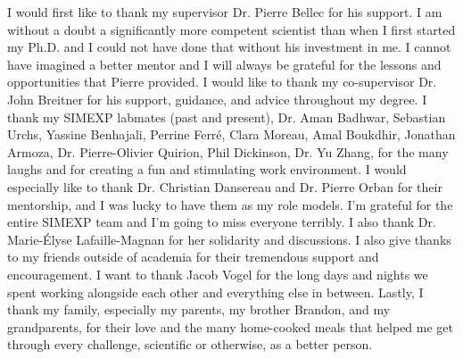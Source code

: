 \documentclass[
12pt, %
oneside, %
english, %
onehalfspacing, %
liststotoc, %
toctotoc, %
headsepline, %
consistentlayout, %
]{MastersDoctoralThesis} %
\begin{document}

\begin{acknowledgements}
\addchaptertocentry{\acknowledgementname} %
I would first like to thank my supervisor Dr. Pierre Bellec for his support. I am without a doubt a significantly more competent scientist than when I first started my Ph.D. and I could not have done that without his investment in me. I cannot have imagined a better mentor and I will always be grateful for the lessons and opportunities that Pierre provided. I would like to thank my co-supervisor Dr. John Breitner for his support, guidance, and advice throughout my degree. I thank my SIMEXP labmates (past and present), Dr. Aman Badhwar, Sebastian Urchs, Yassine Benhajali, Perrine Ferré, Clara Moreau, Amal Boukdhir, Jonathan Armoza, Dr. Pierre-Olivier Quirion, Phil Dickinson, Dr. Yu Zhang, for the many laughs and for creating a fun and stimulating work environment. I would especially like to thank Dr. Christian Dansereau and Dr. Pierre Orban for their mentorship, and I was lucky to have them as my role models. I'm grateful for the entire SIMEXP team and I'm going to miss everyone terribly. I also thank Dr. Marie-Élyse Lafaille-Magnan for her solidarity and discussions. I also give thanks to my friends outside of academia for their tremendous support and encouragement. I want to thank Jacob Vogel for the long days and nights we spent working alongside each other and everything else in between. Lastly, I thank my family, especially my parents, my brother Brandon, and my grandparents, for their love and the many home-cooked meals that helped me get through every challenge, scientific or otherwise, as a better person.
\end{acknowledgements}





\cleardoublepage

\end{document}
